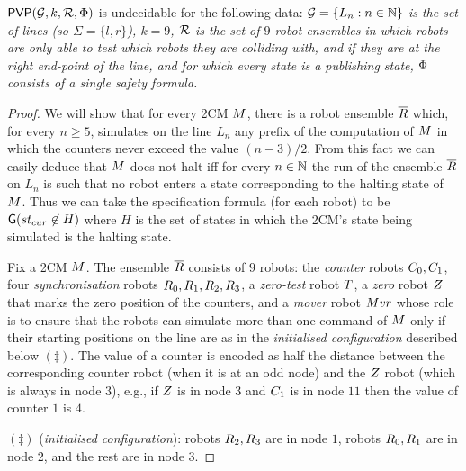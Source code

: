 \begin{theorem} \label{thm:undec-lines-local}
$\mathsf{PVP}(\mathcal{G},k,\mathcal{R},\Phi)$ is undecidable for the following data:
\it
\- $\mathcal{G} = \{L_n : n \in \mathbb{N}\}$ is the set of lines (so $\Sigma = \{l,r\}$),
\- $k = 9$,
\- $\mathcal{R}$ is the set of $9$-robot ensembles in which robots are only able to test which robots they are colliding with, and if they are at the right end-point of the line, and for which every state is a publishing state, 
\- $\Phi$ consists of a single safety formula.
\ti
\end{theorem}
\begin{proof}
We will show that for every 2CM $M$, there is a robot ensemble $\overline{R}$ which, for every $n \geq 5$, simulates on the line $L_n$ any prefix of the computation of $M$ in which the counters never exceed the value $(n-3)/2$.
From this fact we can easily deduce that $M$ does not halt iff for every $n \in \mathbb{N}$ the run of the ensemble $\overline{R}$ on
$L_n$ is such that no robot enters a state corresponding to the halting state of $M$. Thus we can take the specification formula (for each robot) 
to be $\operatorname{\mathsf{G}} (st_{cur} \not \in H)$ 
where $H$ is the set of states in which the 2CM's state being simulated is the halting state.

Fix a 2CM $M$. The ensemble $\overline{R}$ consists of $9$ robots: the {\em counter} robots $C_0, C_1$, four {\em synchronisation} robots $R_0,R_1,R_2,R_3$, a {\em zero-test} robot $T$, a {\em zero} robot $Z$ that marks the zero position of the counters, and a {\em mover} robot $Mvr$ whose role is to ensure that the robots can simulate more than one command of $M$ only if their starting positions on the line are as in the {\em initialised configuration} described below $(\ddagger)$. The value of a counter is encoded as half the distance between the corresponding counter robot (when it is at an odd node) and the $Z$ robot (which is always in node $3$), e.g., if $Z$ is in node $3$ and $C_1$ is in node $11$ then the value of counter $1$ is $4$.


$(\ddagger)$ ({\em initialised configuration}):
robots $R_2, R_3$ are in node $1$, robots $R_0,R_1$ are in node $2$, and the rest are in node $3$.


\end{proof}
